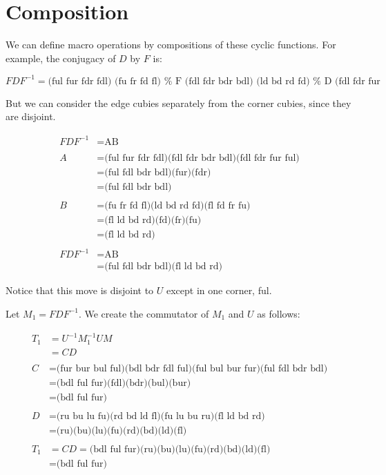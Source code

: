 \section{Composition}

We can define macro operations by compositions of these cyclic
functions.  For example, the conjugacy of $D$ by $F$ is:

\begin{displaymath}
    FDF^{-1}
  = \text{(ful fur fdr fdl) (fu fr fd fl)     %
          (fdl fdr bdr bdl) (ld bd rd fd)     %
          (fdl fdr fur ful) (fl fd fr fu)}    %
\end{displaymath}

But we can consider the edge cubies separately from the corner cubies,
since they are disjoint.

\begin{align*}
  FDF^{-1} &= \text{AB} \\
  &       \\
  A
  &= \text{(ful fur fdr fdl)(fdl fdr bdr bdl)(fdl fdr fur ful)} \\
  &= \text{(ful fdl bdr bdl)(fur)(fdr)} \\
  &= \text{(ful fdl bdr bdl)} \\
  & \\
  B
  &= \text{(fu fr fd fl)(ld bd rd fd)(fl fd fr fu)} \\
  &= \text{(fl ld bd rd)(fd)(fr)(fu)} \\
  &= \text{(fl ld bd rd)} \\
  & \\
  FDF^{-1}
  &= \text{AB} \\
  &= \text{(ful fdl bdr bdl)(fl ld bd rd)}
\end{align*}

Notice that this move is disjoint to $U$ except in one corner, ful.

Let $M_1 = FDF^{-1}$.  We create the commutator of $M_1$ and $U$ as
follows:

\begin{align*}
  T_1
  &= U^{-1}M_1^{-1}UM \\
  &= CD \\
  & \\
  C
  &= \text{(fur bur bul ful)(bdl bdr fdl ful)(ful bul bur fur)(ful fdl bdr bdl)} \\
  &= \text{(bdl ful fur)(fdl)(bdr)(bul)(bur)} \\
  &= \text{(bdl ful fur)} \\
  & \\
  D
  &= \text{(ru bu lu fu)(rd bd ld fl)(fu lu bu ru)(fl ld bd rd)} \\
  &= \text{(ru)(bu)(lu)(fu)(rd)(bd)(ld)(fl)} \\
  & \\
  T_1
  &= CD = \text{(bdl ful fur)(ru)(bu)(lu)(fu)(rd)(bd)(ld)(fl)} \\
  &= \text{(bdl ful fur)} \\
\end{align*}
  
